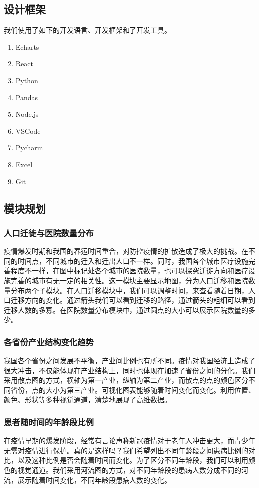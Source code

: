 \documentclass{ctexart}
\begin{document}
\subsection{设计框架}
我们使用了如下的开发语言、开发框架和了开发工具。
\begin{enumerate}
    \item Echarts
    \item React
    \item Python
    \item Pandas
    \item Node.js
    \item VSCode
    \item Pycharm
    \item Excel
    \item Git
\end{enumerate}
\subsection{模块规划}
\subsubsection{人口迁徙与医院数量分布}
疫情爆发时期和我国的春运时间重合，对防控疫情的扩散造成了极大的挑战。在不同的时间点，不同城市的迁入和迁出人口不一样。同时，我国各个城市医疗设施完善程度不一样，在图中标记处各个城市的医院数量，也可以探究迁徙方向和医疗设施完善的城市有无一定的相关性。这一模块主要显示地图，分为人口迁移和医院数量分布两个子模块。在人口迁移模块中，我们可以调整时间，来查看随着日期，人口迁移方向的变化。通过箭头我们可以看到迁移的路径，通过箭头的粗细可以看到迁移人数的多寡。在医院数量分布模块中，通过圆点的大小可以展示医院数量的多少。
\subsubsection{各省份产业结构变化趋势}
我国各个省份之间发展不平衡，产业间比例也有所不同。疫情对我国经济上造成了很大冲击，不仅能体现在产业结构上，同时也体现在加速了省份之间的分化。我们采用散点图的方式，横轴为第一产业，纵轴为第二产业，而散点的点的颜色区分不同省份，点的大小为第三产业。可视化图表能够随着时间变化而变化。利用位置、颜色、形状等多种视觉通道，清楚地展现了高维数据。
\subsubsection{患者随时间的年龄段比例}
在疫情早期的爆发阶段，经常有言论声称新冠疫情对于老年人冲击更大，而青少年无需对疫情进行保护。真的是这样吗？我们希望列出不同年龄段之间患病比例的对比，以及这种比例是否会随着时间而变化。为了区分不同年龄段，我们可以利用颜色的视觉通道。我们采用河流图的方式，对不同年龄段的患病人数分成不同的河流，展示随着时间变化，不同年龄段患病人数的变化。
\end{document}
